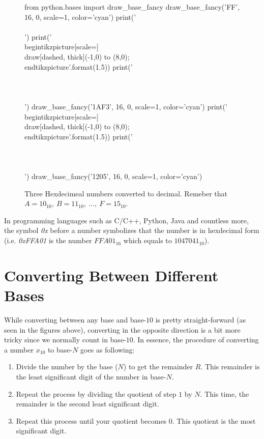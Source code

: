\begin{figure}
  \centering
  \begin{pycode}
from python.bases import draw_base_fancy
draw_base_fancy('FF', 16, 0, scale=1, color='cyan')
print('\\\\')
print('\\begin{{tikzpicture}}[scale={}] \\draw[dashed, thick](-1,0) to (8,0); \\end{{tikzpicture}}'.format(1.5))
print('\\\\~\\\\')
draw_base_fancy('1AF3', 16, 0, scale=1, color='cyan')
print('\\begin{{tikzpicture}}[scale={}] \\draw[dashed, thick](-1,0) to (8,0); \\end{{tikzpicture}}'.format(1.5))
print('\\\\~\\\\')
draw_base_fancy('1205', 16, 0, scale=1, color='cyan')
  \end{pycode}
  \caption[Hex numbers]{Three Hexdecimeal numbers converted to decimal. Remeber that $A=10_{10},\ B=11_{10},\ \dots,\ F=15_{10}$.}
  \label{fig:num_base16}
\end{figure} 

In programming languages such as C/C++, Python, Java and countless more, the symbol \textit{0x} before a number symbolizes that the number is in hexdecimal form (i.e. \textit{0xFFA01} is the number $FFA01_{16}$ which equals to $1047041_{10}$). \par

\section{Converting Between Different Bases}
While converting between any base and base-$10$ is pretty straight-forward (as seen in the figures above), converting in the opposite direction is a bit more tricky since we normally count in base-$10$. In essence, the procedure of converting a number $x_{10}$ to base-$N$ goes as following:
\begin{enumerate}
  \item Divide the number by the base ($N$) to get the remainder $R$. This remainder is the least significant digit of the number in base-$N$.
  \item Repeat the process by dividing the quotient of step $1$ by $N$. This time, the remainder is the second least significant digit.
  \item Repeat this process until your quotient becomes $0$. This quotient is the most significant digit.
\end{enumerate}

